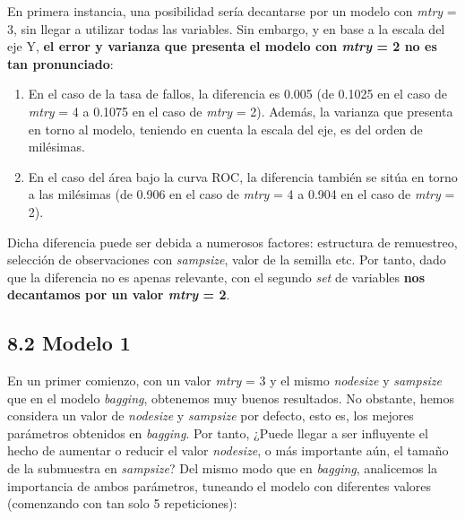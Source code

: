 \documentclass[
]{article}
\begin{document}
En primera instancia, una posibilidad sería decantarse por un modelo con
\emph{mtry} = 3, sin llegar a utilizar todas las variables. Sin embargo,
y en base a la escala del eje Y, \textbf{el error y varianza que
presenta el modelo con \emph{mtry} = 2 no es tan pronunciado}:

\begin{enumerate}
\def\labelenumi{\arabic{enumi}.}
\item
  En el caso de la tasa de fallos, la diferencia es 0.005 (de 0.1025 en
  el caso de \emph{mtry} = 4 a 0.1075 en el caso de \emph{mtry} = 2).
  Además, la varianza que presenta en torno al modelo, teniendo en
  cuenta la escala del eje, es del orden de milésimas.
\item
  En el caso del área bajo la curva ROC, la diferencia también se sitúa
  en torno a las milésimas (de 0.906 en el caso de \emph{mtry} = 4 a
  0.904 en el caso de \emph{mtry} = 2).
\end{enumerate}

Dicha diferencia puede ser debida a numerosos factores: estructura de
remuestreo, selección de observaciones con \emph{sampsize}, valor de la
semilla etc. Por tanto, dado que la diferencia no es apenas relevante,
con el segundo \emph{set} de variables \textbf{nos decantamos por un
valor \emph{mtry} = 2}.

\hypertarget{modelo-1-2}{%
\subsection{8.2 Modelo 1}\label{modelo-1-2}}

En un primer comienzo, con un valor \emph{mtry} = 3 y el mismo
\emph{nodesize} y \emph{sampsize} que en el modelo \emph{bagging},
obtenemos muy buenos resultados. No obstante, hemos considera un valor
de \emph{nodesize} y \emph{sampsize} por defecto, esto es, los mejores
parámetros obtenidos en \emph{bagging}. Por tanto, ¿Puede llegar a ser
influyente el hecho de aumentar o reducir el valor \emph{nodesize}, o
más importante aún, el tamaño de la submuestra en \emph{sampsize}? Del
mismo modo que en \emph{bagging}, analicemos la importancia de ambos
parámetros, tuneando el modelo con diferentes valores (comenzando con
tan solo 5 repeticiones):
\end{document}
